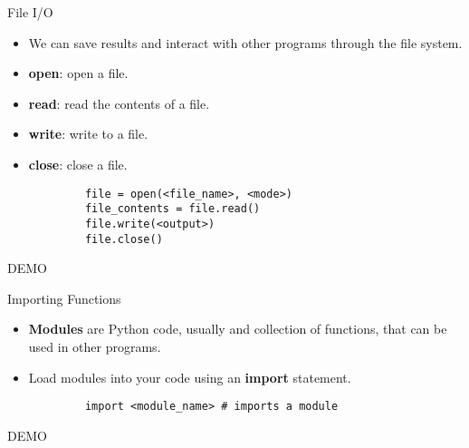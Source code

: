 \documentclass[serif,xcolor=pdftex,dvipsnames,table,hyperref={bookmarks=false,breaklinks}]{beamer}
\begin{document}
\begin{frame}[t,fragile]{File I/O}
	\begin{itemize}[<+->]
		\item We can save results and interact with other programs through the file system.
		\item \textbf{open}: open a file.
		\item \textbf{read}: read the contents of a file.
		\item \textbf{write}: write to a file.
		\item \textbf{close}: close a file.
	\end{itemize}
	\pause
	\begin{tcolorbox}
		\begin{verbatim}
			file = open(<file_name>, <mode>) 
			file_contents = file.read()
			file.write(<output>) 
			file.close() 
		\end{verbatim}
	\end{tcolorbox}
	\pause
  \centering
  \Huge{DEMO}
\end{frame}




\begin{frame}[t,fragile]{Importing Functions}
	\begin{itemize}[<+->]
		\item \textbf{Modules} are Python code, usually and collection of functions, that can be used in other programs.
		\item Load modules into your code using an \textbf{import} statement.
	\end{itemize}
	\pause
	\begin{tcolorbox}
		\begin{verbatim}
			import <module_name> # imports a module
		\end{verbatim}
	\end{tcolorbox}
	\pause
	\centering
	\Huge{DEMO}
\end{frame}

\end{document}
